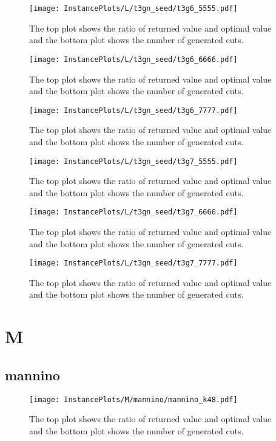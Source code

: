 \documentclass[10pt,a4paper]{article}
\begin{document}
\begin{figure}[H]
\texttt{[image: InstancePlots/L/t3gn\_seed/t3g6\_5555.pdf]}
\caption{The top plot shows the ratio of returned value and optimal value     and the bottom plot shows the number of generated cuts.}
\end{figure}

\begin{figure}[H]
\texttt{[image: InstancePlots/L/t3gn\_seed/t3g6\_6666.pdf]}
\caption{The top plot shows the ratio of returned value and optimal value     and the bottom plot shows the number of generated cuts.}
\end{figure}

\begin{figure}[H]
\texttt{[image: InstancePlots/L/t3gn\_seed/t3g6\_7777.pdf]}
\caption{The top plot shows the ratio of returned value and optimal value     and the bottom plot shows the number of generated cuts.}
\end{figure}

\begin{figure}[H]
\texttt{[image: InstancePlots/L/t3gn\_seed/t3g7\_5555.pdf]}
\caption{The top plot shows the ratio of returned value and optimal value     and the bottom plot shows the number of generated cuts.}
\end{figure}

\begin{figure}[H]
\texttt{[image: InstancePlots/L/t3gn\_seed/t3g7\_6666.pdf]}
\caption{The top plot shows the ratio of returned value and optimal value     and the bottom plot shows the number of generated cuts.}
\end{figure}

\begin{figure}[H]
\texttt{[image: InstancePlots/L/t3gn\_seed/t3g7\_7777.pdf]}
\caption{The top plot shows the ratio of returned value and optimal value     and the bottom plot shows the number of generated cuts.}
\end{figure}

\section{M}
\subsection{mannino}
\begin{figure}[H]
\texttt{[image: InstancePlots/M/mannino/mannino\_k48.pdf]}
\caption{The top plot shows the ratio of returned value and optimal value     and the bottom plot shows the number of generated cuts.}
\end{figure}
\end{document}
